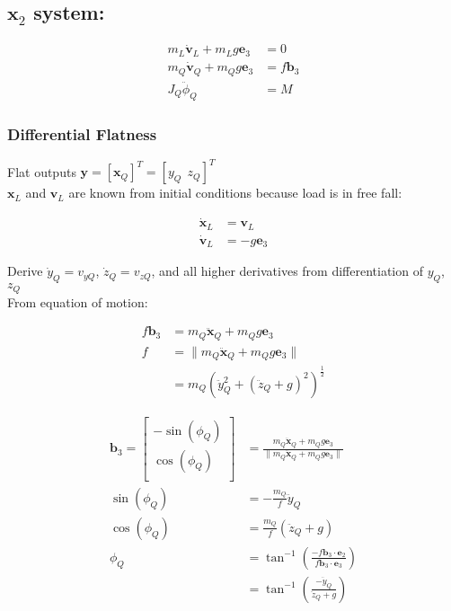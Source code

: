 \documentclass[11pt]{article}
\begin{document}
\subsection{$\mathbf{x}_2$ system:}

\begin{align*}
m_L \mathbf{\dot{v}}_L + m_L g \mathbf{e}_3 &= 0 \\
m_Q \mathbf{\dot{v}}_Q + m_Q g \mathbf{e}_3 &= f \mathbf{b}_3 \\
J_Q \ddot{\phi}_Q &= M 
\end{align*}



\subsubsection{Differential Flatness}

Flat outputs $\mathbf{y} = [\mathbf{x}_Q]^T = [ y_Q \ \ z_Q]^T$  \\

\mbox{} \newline
$\mathbf{x}_L$ and $\mathbf{v}_L$ are known from initial conditions because load is in free fall:

\begin{align*}
\mathbf{\dot{x}}_L &= \mathbf{v}_L \\
\mathbf{\dot{v}}_L &= -g \mathbf{e}_3
\end{align*}

Derive $\dot{y}_Q = v_{yQ}$, $\dot{z}_Q = v_{zQ}$, and all higher derivatives from differentiation of $y_Q$, $z_Q$ \\

\mbox{} \newline
From equation of motion:

\begin{align*}
f \mathbf{b}_3 &= m_Q \mathbf{\ddot{x}}_Q +  m_Q g \mathbf{e}_3 \\
f &= \| m_Q \mathbf{\ddot{x}}_Q +  m_Q g \mathbf{e}_3 \| \\
&= m_Q \left( \ddot{y}_Q^2 + (\ddot{z}_Q + g)^2 \right) ^{\frac{1}{2}} 
\end{align*}

\begin{align*}
\mathbf{b}_3 = 
\begin{bmatrix}
       -\sin(\phi_Q) \\
        \cos(\phi_Q) \\
\end{bmatrix} 
&= \frac{ m_Q \mathbf{\ddot{x}}_Q +  m_Q g \mathbf{e}_3 } { \| m_Q \mathbf{\ddot{x}}_Q +  m_Q g \mathbf{e}_3 \|} \\
\sin(\phi_Q) &= - \frac{m_Q}{f} \ddot{y}_Q \\
\cos(\phi_Q) &= \frac{m_Q}{f} (\ddot{z}_Q + g) \\
\phi_Q &= 
\tan^{-1} \left(  
\frac{ - f \mathbf{b}_3 \cdot \mathbf{e}_2 } { f \mathbf{b}_3 \cdot \mathbf{e}_3 } 
\right) \\
&= \tan^{-1} \left(  
\frac{ - \ddot{y}_Q} { \ddot{z}_Q + g } 
\right) 
\end{align*} 
\end{document}
